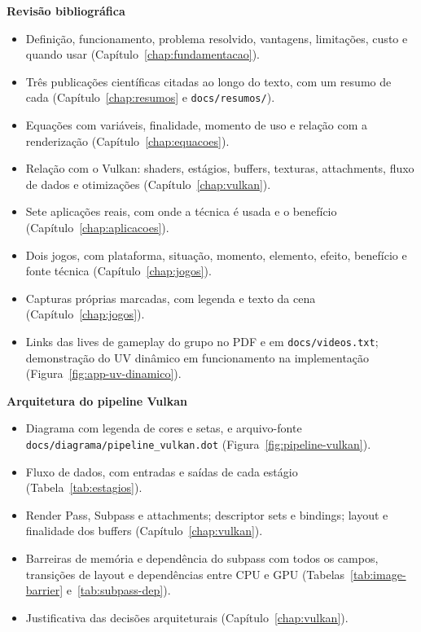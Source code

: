 \documentclass[12pt,a4paper]{report}
\begin{document}
\textbf{Revisão bibliográfica}
\begin{itemize}
    \item[$\boxtimes$] Definição, funcionamento, problema resolvido, vantagens, limitações, custo e quando usar (Capítulo~\ref{chap:fundamentacao}).
    \item[$\boxtimes$] Três publicações científicas citadas ao longo do texto, com um resumo de cada (Capítulo~\ref{chap:resumos} e \texttt{docs/resumos/}).
    \item[$\boxtimes$] Equações com variáveis, finalidade, momento de uso e relação com a renderização (Capítulo~\ref{chap:equacoes}).
    \item[$\boxtimes$] Relação com o Vulkan: shaders, estágios, buffers, texturas, attachments, fluxo de dados e otimizações (Capítulo~\ref{chap:vulkan}).
    \item[$\boxtimes$] Sete aplicações reais, com onde a técnica é usada e o benefício (Capítulo~\ref{chap:aplicacoes}).
    \item[$\boxtimes$] Dois jogos, com plataforma, situação, momento, elemento, efeito, benefício e fonte técnica (Capítulo~\ref{chap:jogos}).
    \item[$\boxtimes$] Capturas próprias marcadas, com legenda e texto da cena (Capítulo~\ref{chap:jogos}).
    \item[$\boxtimes$] Links das lives de gameplay do grupo no PDF e em \texttt{docs/videos.txt}; demonstração do UV dinâmico em funcionamento na implementação (Figura~\ref{fig:app-uv-dinamico}).
\end{itemize}

\textbf{Arquitetura do pipeline Vulkan}
\begin{itemize}
    \item[$\boxtimes$] Diagrama com legenda de cores e setas, e arquivo-fonte \texttt{docs/diagrama/pipeline\_vulkan.dot} (Figura~\ref{fig:pipeline-vulkan}).
    \item[$\boxtimes$] Fluxo de dados, com entradas e saídas de cada estágio (Tabela~\ref{tab:estagios}).
    \item[$\boxtimes$] Render Pass, Subpass e attachments; descriptor sets e bindings; layout e finalidade dos buffers (Capítulo~\ref{chap:vulkan}).
    \item[$\boxtimes$] Barreiras de memória e dependência do subpass com todos os campos, transições de layout e dependências entre CPU e GPU (Tabelas~\ref{tab:image-barrier} e~\ref{tab:subpass-dep}).
    \item[$\boxtimes$] Justificativa das decisões arquiteturais (Capítulo~\ref{chap:vulkan}).
\end{itemize}
\end{document}
